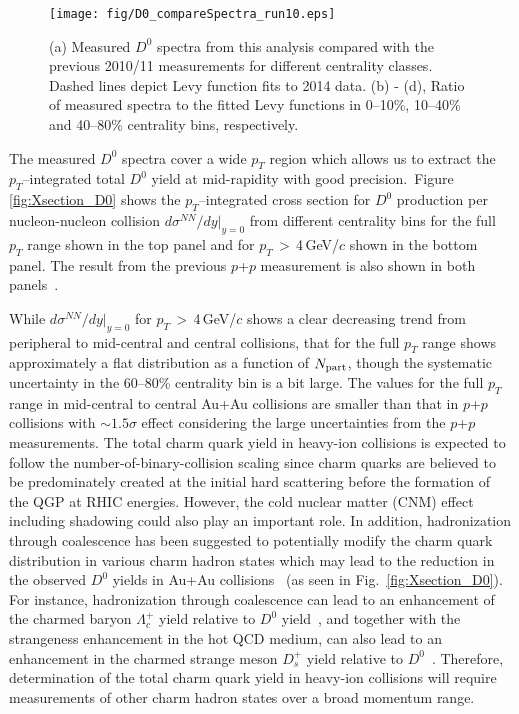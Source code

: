 \documentclass[%
 reprint,	
showpacs,
 amsmath,amssymb,
 aps,
 prc,
]{revtex4-1}
\begin{document}
\begin{figure}
\centering
\texttt{[image: fig/D0\_compareSpectra\_run10.eps]}
  \caption{(a) Measured $D^{0}$ spectra from this analysis compared with the previous 2010/11 measurements for different centrality classes. Dashed lines depict Levy function fits to 2014 data. (b) - (d), Ratio of measured spectra to the fitted Levy functions in 0--10\%, 10--40\% and 40--80\% centrality bins, respectively.}
\label{fig:D0_compareSpectra_run10} 
\end{figure}


The measured $D^0$ spectra cover a wide $p_{T}$ region which allows us to extract the $p_{T}$--integrated total $D^0$ yield at mid-rapidity with good precision.\,\,\,Figure\,\,\ref{fig:Xsection_D0} shows the $p_{T}$--integrated cross section for $D^0$ production per nucleon-nucleon collision $d\sigma^{NN}/dy|_{y=0}$ from different centrality bins for the full $p_{T}$ range shown in the top panel and for $p_{T}$\,$>$\,4\,GeV/$c$ shown in the bottom panel. The result from the previous $p$+$p$ measurement is also shown in both panels~\cite{Star_D_pp}.

While $d\sigma^{NN}/dy|_{y=0}$ for $p_{T}$\,$>$\,4\,GeV/$c$ shows a clear decreasing trend from peripheral to mid-central and central collisions, that for the full $p_T$ range shows approximately a flat distribution as a function of $N_{\rm part}$, though the systematic uncertainty in the 60--80\% centrality bin is a bit large. The values for the full $p_T$ range in mid-central to central Au+Au collisions are smaller than that in $p$+$p$ collisions with $\sim1.5\sigma$ effect considering the large uncertainties from the $p$+$p$ measurements. The total charm quark yield in heavy-ion collisions is expected to follow the number-of-binary-collision scaling since charm quarks are believed to be predominately created at the initial hard scattering before the formation of the QGP at RHIC energies. However, the cold nuclear matter (CNM) effect including shadowing could also play an important role. In addition, hadronization through coalescence has been suggested to potentially modify the charm quark distribution in various charm hadron states which may lead to the reduction in the observed $D^0$ yields in Au+Au collisions~\cite{GRECO2004202} (as seen in Fig.~\ref{fig:Xsection_D0}). For instance, hadronization through coalescence can lead to an enhancement of the charmed baryon $\Lambda_{c}^+$ yield relative to $D^0$ yield~\cite{Oh2009,Zhao:2018jlw,Plumari:2017ntm}, and together with the strangeness enhancement in the hot QCD medium, can also lead to an enhancement in the charmed strange meson $D_{s}^+$ yield relative to $D^0$~\cite{He2013,Zhao:2018jlw,Plumari:2017ntm}. Therefore, determination of the total charm quark yield in heavy-ion collisions will require measurements of other charm hadron states over a broad momentum range. 
\end{document}
